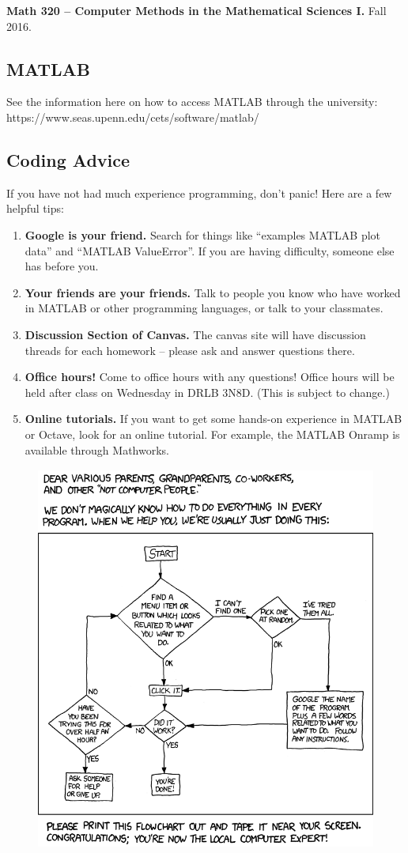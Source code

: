 \documentclass[12pt]{amsart}
\begin{document}
{\bf Math 320 -- Computer Methods in the Mathematical Sciences I.} Fall 2016.
\\[3mm]
\subsection*{MATLAB}
See the information here on how to access MATLAB through the university:
https://www.seas.upenn.edu/cets/software/matlab/

\subsection*{Coding Advice}
If you have not had much experience programming, don't panic!
Here are a few helpful tips:
\begin{enumerate}
\item {\bf Google is your friend.} Search for things like ``examples
MATLAB plot data'' and ``MATLAB ValueError''. If you are having
difficulty, someone else has before you.
\item {\bf Your friends are your friends.} Talk to people you
know who have worked in MATLAB or other programming languages, 
or talk to your classmates.
\item {\bf Discussion Section of Canvas.} The canvas site will
have discussion threads for each homework -- please ask and answer
questions there. 
\item {\bf Office hours!} Come to office hours with any questions!
Office hours will be held after class on Wednesday in 
DRLB 3N8D. (This is subject to change.)
\item {\bf Online tutorials.} If you want to get some hands-on
experience in MATLAB or Octave, look for an online tutorial. 
For example, the MATLAB Onramp is available through Mathworks.
\end{enumerate}

\begin{figure}[b!]
\includegraphics[height=5in]{xkcd_techsupport.png}
\end{figure}
\end{document}
